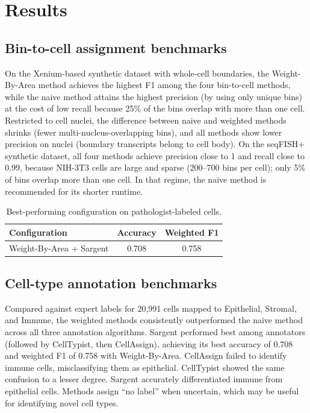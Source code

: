 \documentclass[11pt]{article}
\begin{document}
\section{Results}
\subsection{Bin-to-cell assignment benchmarks}
On the Xenium-based synthetic dataset with whole-cell boundaries, the Weight-By-Area method achieves the highest F1 among the four bin-to-cell methods, while the naive method attains the highest precision (by using only unique bins) at the cost of low recall because 25\% of the bins overlap with more than one cell. Restricted to cell nuclei, the difference between naive and weighted methods shrinks (fewer multi-nucleus-overlapping bins), and all methods show lower precision on nuclei (boundary transcripts belong to cell body). On the seqFISH+ synthetic dataset, all four methods achieve precision close to 1 and recall close to 0.99, because NIH-3T3 cells are large and sparse (200--700 bins per cell); only 5\% of bins overlap more than one cell. In that regime, the naive method is recommended for its shorter runtime.

\begin{table}[h]
\centering
\caption{Best-performing configuration on pathologist-labeled cells.}
\begin{tabular}{lcc}
\toprule
Configuration & Accuracy & Weighted F1 \\
\midrule
Weight-By-Area + Sargent & 0.708 & 0.758 \\
\bottomrule
\end{tabular}
\end{table}

\subsection{Cell-type annotation benchmarks}
Compared against expert labels for 20,991 cells mapped to Epithelial, Stromal, and Immune, the weighted methods consistently outperformed the naive method across all three annotation algorithms. Sargent performed best among annotators (followed by CellTypist, then CellAssign), achieving its best accuracy of 0.708 and weighted F1 of 0.758 with Weight-By-Area. CellAssign failed to identify immune cells, misclassifying them as epithelial. CellTypist showed the same confusion to a lesser degree. Sargent accurately differentiated immune from epithelial cells. Methods assign ``no label'' when uncertain, which may be useful for identifying novel cell types.
\end{document}
